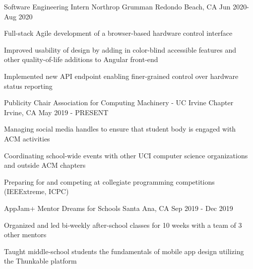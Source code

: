 
\begin{cventries}
	\cventry
	{Software Engineering Intern}
	{Northrop Grumman}
	{Redondo Beach, CA}
	{Jun 2020-Aug 2020}
	{
		\begin{cvitems}
			\item{Full-stack Agile development of a browser-based hardware control interface}
			\item{Improved usability of design by adding in color-blind accessible features and other quality-of-life additions to Angular front-end}
			\item{Implemented new API endpoint enabling finer-grained control over hardware status reporting}
		\end{cvitems}
	}

	\cventry
	{Publicity Chair} %
	{Association for Computing Machinery - UC Irvine Chapter} %
	{Irvine, CA} %
	{May 2019 - PRESENT} %
	{
		\begin{cvitems}
			\item{Managing social media handles to ensure that student body is engaged with ACM activities}
			\item {Coordinating school-wide events with other UCI computer science organizations and outside ACM chapters}
			\item {Preparing for and competing at collegiate programming competitions (IEEExtreme, ICPC)}
		\end{cvitems}
	}

	\cventry
	{AppJam+ Mentor}
	{Dreams for Schools}
	{Santa Ana, CA}
	{Sep 2019 - Dec 2019}
	{
	\begin{cvitems}
		\item{Organized and led bi-weekly after-school classes for 10 weeks with a team of 3 other mentors}
		\item{Taught middle-school students the fundamentals of mobile app design utilizing the Thunkable platform}
	\end{cvitems}
	}
\end{cventries}
